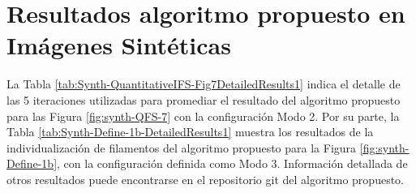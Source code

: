 


\section{Resultados algoritmo propuesto en Im\'agenes Sint\'eticas}

La Tabla \ref{tab:Synth-QuantitativeIFS-Fig7DetailedResults1} indica el detalle de las 5 iteraciones utilizadas para promediar el resultado del algoritmo propuesto para las Figura \ref{fig:synth-QFS-7} con la configuraci\'on Modo 2. Por su parte, la Tabla  \ref{tab:Synth-Define-1b-DetailedResults1} muestra los resultados de la individualizaci\'on de filamentos del algoritmo propuesto para la Figura \ref{fig:synth-Define-1b}, con la configuraci\'on definida como Modo 3. Informaci\'on detallada de otros resultados puede encontrarse en el repositorio git del algoritmo propuesto.

